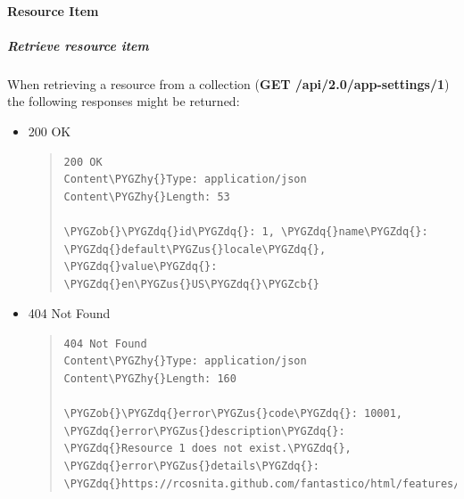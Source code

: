 \documentclass[letterpaper,10pt,english]{sphinxmanual}
\def\PYGZus{\char`\_}
\def\PYGZob{\char`\{}
\def\PYGZcb{\char`\}}
\def\PYGZhy{\char`\-}
\def\PYGZdq{\char`\"}
\begin{document}
\paragraph{Resource Item}
\label{features/roa/rest_responses:resource-item}

\subparagraph{Retrieve resource item}
\label{features/roa/rest_responses:retrieve-resource-item}
When retrieving a resource from a collection (\textbf{GET /api/2.0/app-settings/1}) the following responses might be returned:
\begin{itemize}
\item {} 
200 OK
\begin{quote}

\begin{Verbatim}[commandchars=\\\{\}]
200 OK
Content\PYGZhy{}Type: application/json
Content\PYGZhy{}Length: 53

\PYGZob{}\PYGZdq{}id\PYGZdq{}: 1, \PYGZdq{}name\PYGZdq{}: \PYGZdq{}default\PYGZus{}locale\PYGZdq{}, \PYGZdq{}value\PYGZdq{}: \PYGZdq{}en\PYGZus{}US\PYGZdq{}\PYGZcb{}
\end{Verbatim}
\end{quote}

\item {} 
404 Not Found
\begin{quote}

\begin{Verbatim}[commandchars=\\\{\}]
404 Not Found
Content\PYGZhy{}Type: application/json
Content\PYGZhy{}Length: 160

\PYGZob{}\PYGZdq{}error\PYGZus{}code\PYGZdq{}: 10001, \PYGZdq{}error\PYGZus{}description\PYGZdq{}: \PYGZdq{}Resource 1 does not exist.\PYGZdq{}, \PYGZdq{}error\PYGZus{}details\PYGZdq{}: \PYGZdq{}https://rcosnita.github.com/fantastico/html/features/roa/1000x.html\PYGZdq{}\PYGZcb{}
\end{Verbatim}
\end{quote}

\end{itemize}
\end{document}
